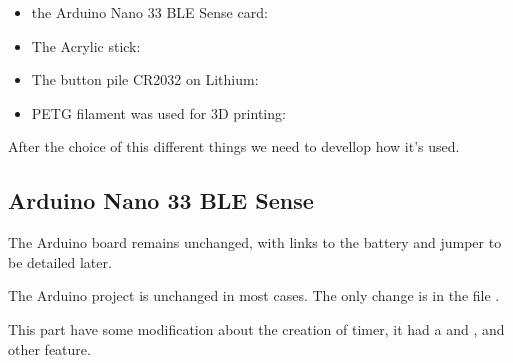 \begin{itemize}
    \item the Arduino Nano 33 BLE Sense card:
    
    
    \item The Acrylic stick: 
    
    
    \item The button pile CR2032 on Lithium:
    
    
    \item PETG filament was used for 3D printing: 
    
    
\end{itemize}

After the choice of this different things we need to devellop how it's used. 

\subsection{Arduino Nano 33 BLE Sense}

The Arduino board remains unchanged, with links to the battery and jumper to be detailed later. 

The Arduino project is unchanged in most cases. The only change is in the file .

\begin{center}
    \label{Code:ArduinoModif}
\end{center}

This part have some modification about the creation of timer, it had a  and , and other feature. 

\begin{center}
    \label{Code:ArduinoModif2}
\end{center}

